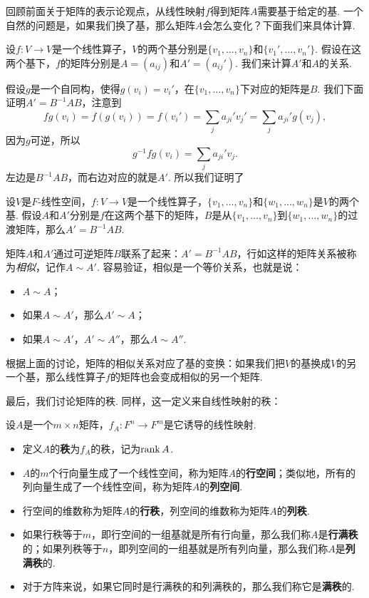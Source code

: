 回顾前面关于矩阵的表示论观点，从线性映射$f$得到矩阵$A$需要基于给定的基. 一个自然的问题是，如果我们换了基，那么矩阵$A$会怎么变化？下面我们来具体计算. 

设$f:V\to V$是一个线性算子，$V$的两个基分别是$\{v_1,\dots,v_n\}$和$\{v_1',\dots,v_n'\}$. 假设在这两个基下，$f$的矩阵分别是$A=(a_{ij})$和$A'=(a_{ij}')$. 我们来计算$A'$和$A$的关系. 

假设$g$是一个自同构，使得$g(v_i)=v_i'$，在$\{v_1,\dots,v_n\}$下对应的矩阵是$B$. 我们下面证明$A'=B^{-1}AB$，注意到
\[fg(v_i)=f(g(v_i))=f(v_i')=\sum_{j}a_{ji}'v_j'=\sum_{j}a_{ji}'g(v_j),\]
因为$g$可逆，所以
\[g^{-1}fg(v_i)=\sum_{j}a_{ji}'v_j.\]
左边是$B^{-1}AB$，而右边对应的就是$A'$. 所以我们证明了

\begin{theorem}\label{thm:base-change}
    设$V$是$F$-线性空间，$f:V\to V$是一个线性算子，$\{v_1,\dots,v_n\}$和$\{w_1,\dots,w_n\}$是$V$的两个基. 假设$A$和$A'$分别是$f$在这两个基下的矩阵，$B$是从$\{v_1,\dots,v_n\}$到$\{w_1,\dots,w_n\}$的过渡矩阵，那么$A'=B^{-1}AB$. 
\end{theorem}

矩阵$A$和$A'$通过可逆矩阵$B$联系了起来：$A'=B^{-1}AB$，行如这样的矩阵关系被称为\emph{相似}，记作$A\sim A'$. 容易验证，相似是一个等价关系，也就是说：
\begin{itemize}
    \item $A\sim A$；
    \item 如果$A\sim A'$，那么$A'\sim A$；
    \item 如果$A\sim A'$，$A'\sim A''$，那么$A\sim A''$.
\end{itemize}

根据上面的讨论，矩阵的相似关系对应了基的变换：如果我们把$V$的基换成$V$的另一个基，那么线性算子$f$的矩阵也会变成相似的另一个矩阵. 

最后，我们讨论矩阵的秩. 同样，这一定义来自线性映射的秩：

\begin{definition}
设$A$是一个$m\times n$矩阵，$f_A:F^n\to F^m$是它诱导的线性映射.
\begin{itemize}
    \item 定义$A$的\textbf{秩}为$f_A$的秩，记为$\operatorname*{rank} A$.
    \item $A$的$m$个行向量生成了一个线性空间，称为矩阵$A$的\textbf{行空间}；类似地，所有的列向量生成了一个线性空间，称为矩阵$A$的\textbf{列空间}.
    \item 行空间的维数称为矩阵$A$的\textbf{行秩}，列空间的维数称为矩阵$A$的\textbf{列秩}.
    \item 如果行秩等于$m$，即行空间的一组基就是所有行向量，那么我们称$A$是\textbf{行满秩}的；如果列秩等于$n$，即列空间的一组基就是所有列向量，那么我们称$A$是\textbf{列满秩}的.
    \item  对于方阵来说，如果它同时是行满秩的和列满秩的，那么我们称它是\textbf{满秩}的. 
\end{itemize}
\end{definition}

